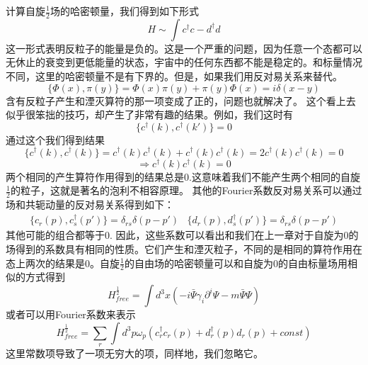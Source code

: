 计算自旋$\frac{1}{2}$场的哈密顿量，我们得到如下形式
$$H\sim \int c^{\dagger}c-d^{\dagger}d$$
这一形式表明反粒子的能量是负的。这是一个严重的问题，因为任意一个态都可以无休止的衰变到更低能量的状态，宇宙中的任何东西都不能是稳定的。和标量情况不同，这里的哈密顿量不是有下界的。但是，如果我们用反对易关系来替代。
$$\{ \Phi(x), \pi(y) \}=\Phi(x)\pi(y)+\pi(y)\Phi(x)=i\delta(x-y)$$
含有反粒子产生和湮灭算符的那一项变成了正的，问题也就解决了。
这个看上去似乎很笨拙的技巧，却产生了非常有趣的结果。例如，我们这时有
$$\{c^{\dagger}(k),c^{\dagger}(k') \}=0$$
通过这个我们得到结果
$$\{ c^{\dagger}(k),c^{\dagger}(k) \}=c^{\dagger}(k)c^{\dagger}(k)+c^{\dagger}(k)c^{\dagger}(k)=2c^{\dagger}(k)c^{\dagger}(k)=0$$
\begin{equation} \label{equ9.38}
\Rightarrow  c^{\dagger}(k)c^{\dagger}(k)=0
\end{equation}
两个相同的产生算符作用得到的结果总是0.这意味着我们不能产生两个相同的自旋$\frac{1}{2}$的粒子，这就是著名的泡利不相容原理。
其他的Fourier系数反对易关系可以通过场和共轭动量的反对易关系得到如下：
\begin{equation} \label{equ9.39}
\left.\begin{array}{cc} \{c_{r}(p),c_{s}^{\dagger}(p') \}=\delta_{rs}\delta(p-p') &  \{d_{r}(p),d_{s}^{\dagger}(p') \}=\delta_{rs}\delta(p-p') \end{array}\right.
\end{equation}
其他可能的组合都等于0. 因此，这些系数可以看出和我们在上一章对于自旋为0的场得到的系数具有相同的性质。它们产生和湮灭粒子，不同的是相同的算符作用在态上两次的结果是0。自旋$\frac{1}{2}$的自由场的哈密顿量可以和自旋为0的自由标量场用相似的方式得到
\begin{equation} \label{equ9.40}
H^{\frac{1}{2}}_{free}=\int d^{3}x(-i\bar{\Psi}\gamma_{i}\partial^{i} \Psi-m\bar{\Psi}\Psi)
\end{equation}
或者可以用Fourier系数来表示
\begin{equation} \label{equ9.41}
H^{\frac{1}{2}}_{free}=\sum_{r}\int d^{3}p \omega_{p}(c_{r}^{\dagger}c_{r}(p)+d^{\dagger}_{r}(p)d_{r}(p)+const)
\end{equation}
这里常数项导致了一项无穷大的项，同样地，我们忽略它。
